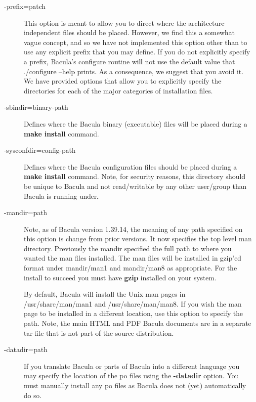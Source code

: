 \begin{description}
\item [ \--prefix=\lt{}patch\gt{}]
   This option is meant to allow you to direct where the architecture
   independent files should be placed.  However, we find this a somewhat
   vague concept, and so we have not implemented this option other than
   to use any explicit prefix that you may define.  If you do not
   explicitly specify a prefix, Bacula's configure routine will not use
   the default value that ./configure --help prints.
   As a consequence, we suggest that
   you avoid it. We have provided options that allow you to explicitly
   specify the directories for each of the major categories of installation
   files.
\item [ {-}{\-}sbindir=\lt{}binary-path\gt{}]
   Defines where the Bacula  binary (executable) files will be placed during a
   {\bf make  install} command.  

\item [ {-}{\-}sysconfdir=\lt{}config-path\gt{}]
   Defines where the Bacula configuration files should be placed during a
   {\bf make install} command.  Note, for security reasons,
   this directory should be unique to Bacula and not read/writable by
   any other user/group than Bacula is running under.

\item [ {-}{\-}mandir=\lt{}path\gt{}]
   Note, as of Bacula version 1.39.14, the meaning of any path
   specified on this option is change from prior versions. It
   now specifies the top level man directory.
   Previously the mandir specified the full path to where you
   wanted the man files installed.
   The man files will be installed in gzip'ed format under
   mandir/man1 and mandir/man8 as appropriate.
   For the install to succeed you must have {\bf gzip} installed
   on your system.

   By default, Bacula will install the Unix man pages in 
   /usr/share/man/man1 and /usr/share/man/man8.  
   If you wish the man page to be installed in
   a different location, use this option to specify the path.
   Note, the main HTML and PDF Bacula documents are in a separate
   tar file that is not part of the source distribution.

\item [ {-}{\-}datadir=\lt{}path\gt{} ]
   If you translate Bacula or parts of Bacula into a different language
   you may specify the location of the po files using the {\bf
   {-}{\-}datadir} option. You must manually install any po files as
   Bacula does not (yet) automatically do so.


\end{description}
